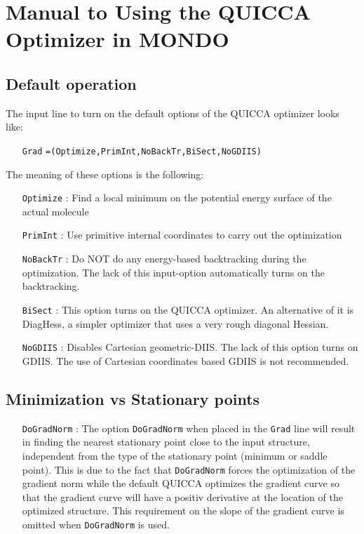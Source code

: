 \documentclass[prl,aps,preprint,superbib,12pt]{revtex4}
\begin{document}

\section{Manual to Using the QUICCA Optimizer in MONDO}

\subsection{Default operation}
The input line to turn on the default options of the QUICCA optimizer
looks like:
\begin{itemize}
\item[{\tt Grad}]{\tt =(Optimize,PrimInt,NoBackTr,BiSect,NoGDIIS) }
\end{itemize}

\noindent
The meaning of these options is the following:
\begin{itemize}
\item[{\tt Optimize}] : Find a local minimum on the potential energy surface of the actual molecule
\item[{\tt PrimInt}] : Use primitive internal coordinates to carry out the optimization
\item[{\tt NoBackTr}] : Do NOT do any energy-based backtracking during
the optimization. The lack of this input-option automatically
turns on the backtracking.
\item[{\tt BiSect}] : This option turns on the QUICCA optimizer. An alternative of it is DiagHess, a simpler optimizer that uses a very rough 
diagonal Hessian.
\item[{\tt NoGDIIS}] : Disables Cartesian geometric-DIIS. The lack of this 
option turns on GDIIS. The use of Cartesian coordinates based 
GDIIS is not recommended.
\end{itemize}

\subsection{Minimization vs Stationary points}
\begin{itemize}
\item[{\tt DoGradNorm}] :
The option {\tt DoGradNorm} when placed in the {\tt Grad} line
will result in finding the nearest stationary point close to the
input structure, independent from the type of the stationary point
(minimum or saddle point). This is due to the fact that
{\tt DoGradNorm} forces the optimization of the gradient norm
while the default QUICCA optimizes the gradient curve so that 
the gradient curve will have a positiv derivative at the location of the
optimized structure. This requirement on the slope of the gradient
curve is omitted when {\tt DoGradNorm} is used.
\end{itemize}
 
\end{document}
